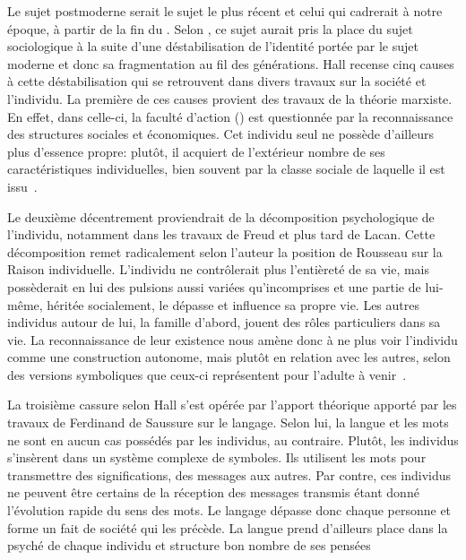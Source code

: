 Le sujet postmoderne serait le sujet le plus récent et celui qui cadrerait à notre époque, à partir de la fin du .
Selon \citeauthor{Hall1996a}, ce sujet aurait pris la place du sujet sociologique à la suite d'une déstabilisation de l'identité portée par le sujet moderne et donc sa fragmentation au fil des générations.
Hall recense cinq causes à cette déstabilisation qui se retrouvent dans divers travaux sur la société et l'individu.
La première de ces causes provient des travaux de la théorie marxiste.
En effet, dans celle-ci, la faculté d'action () est questionnée par la reconnaissance des structures sociales et économiques.
Cet individu seul ne possède d'ailleurs plus d'essence propre: plutôt, il acquiert de l'extérieur nombre de ses caractéristiques individuelles, bien souvent par la classe sociale de laquelle il est issu~\citeyearpar[606]{Hall1996a}.

Le deuxième décentrement proviendrait de la décomposition psychologique de l'individu, notamment dans les travaux de Freud et plus tard de Lacan.
Cette décomposition remet radicalement selon l'auteur la position de Rousseau sur la Raison individuelle.
L'individu ne contrôlerait plus l'entièreté de sa vie, mais possèderait en lui des pulsions aussi variées qu'incomprises et une partie de lui-même, héritée socialement, le dépasse et influence sa propre vie.
Les autres individus autour de lui, la famille d'abord, jouent des rôles particuliers dans sa vie.
La reconnaissance de leur existence nous amène donc à ne plus voir l'individu comme une construction autonome, mais plutôt en relation avec les autres, selon des versions symboliques que ceux-ci représentent pour l'adulte à venir~\citeyearpar[607--608]{Hall1996a}.

La troisième cassure selon Hall s'est opérée par l'apport théorique apporté par les travaux de Ferdinand de Saussure sur le langage.
Selon lui, la langue et les mots ne sont en aucun cas possédés par les individus, au contraire.
Plutôt, les individus s'insèrent dans un système complexe de symboles.
Ils utilisent les mots pour transmettre des significations, des messages aux autres.
Par contre, ces individus ne peuvent être certains de la réception des messages transmis étant donné l'évolution rapide du sens des mots.
Le langage dépasse donc chaque personne et forme un fait de société qui les précède.
La langue prend d'ailleurs place dans la psyché de chaque individu et structure bon nombre de ses pensées~\citeyearpar[608--609]{Hall1996a}

